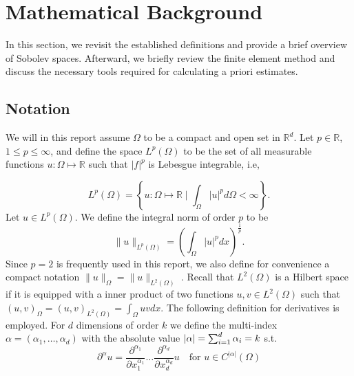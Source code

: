 
\section{Mathematical Background}%
\label{sec:mathematical_background}

In this section, we revisit the established definitions and provide a brief overview of Sobolev spaces. Afterward, we briefly review the finite element method and discuss the necessary tools required for calculating a priori estimates.


\subsection{Notation}%
\label{sub:notation}

We will in this report assume $\Omega $ to be a compact and open set in $\mathbb{R} ^{d}$. Let $p \in \mathbb{R} $, $ 1 \le  p \le  \infty$, and  define the space $L^{p}\left( \Omega  \right) $ to be the set of all measurable functions $u: \Omega  \mapsto \mathbb{R} $ such that
$\left\lvert f \right\rvert ^{p}$ is Lebesgue integrable, i.e,

\begin{equation*}
    L^{p}\left( \Omega  \right) = \left\{ u: \Omega \mapsto \mathbb{R}  \mid \int_{\Omega }^{} \left\lvert u \right\rvert ^{p} d \Omega  < \infty  \right\}
.\end{equation*}
Let $u \in L^{p}\left( \Omega  \right) $. We define the integral norm of order $p$ to be \[
\| u \|_{ L^{p}\left( \Omega  \right)  }^{  }  = \left( \int_{\Omega }^{} \left\lvert u \right\rvert ^{p} dx  \right) ^{\frac{1}{p}}.
\]
Since $p=2$ is frequently used in this report, we also define for convenience a compact notation $\| u \|_{ \Omega  }^{  }  = \| u \|_{ L^{2}\left( \Omega  \right)  }^{  } $ .  Recall that $L^{2}\left( \Omega  \right) $ is a Hilbert space if it is equipped with a inner
product of two functions $u,v \in L^{2}\left( \Omega  \right) $ such that
    $
\left( u,v \right) _{\Omega } = \left( u,v \right) _{L^2\left( \Omega  \right) } = \int_{\Omega }^{} u  v dx.
$
The following definition for derivatives is employed.
For $d$ dimensions of order $k$ we define the multi-index $\alpha  = ( \alpha _{1}, \ldots, \alpha _{d})  $ with the absolute value $\left\lvert  \alpha   \right\rvert = \sum_{i=1}^{d}  \alpha _{i} = k $ s.t.
\[
\partial ^{\alpha} u = \frac{\partial ^{ \alpha_{1}  }  } {\partial^{} x_{1}^{\alpha _{1}}  } \ldots \frac{\partial ^{ \alpha_{d}  }  } {\partial^{} x_{d}^{\alpha _{d}}  } u \quad  \text{for }u \in C^{\left\lvert \alpha  \right\rvert }( \Omega )
\]


